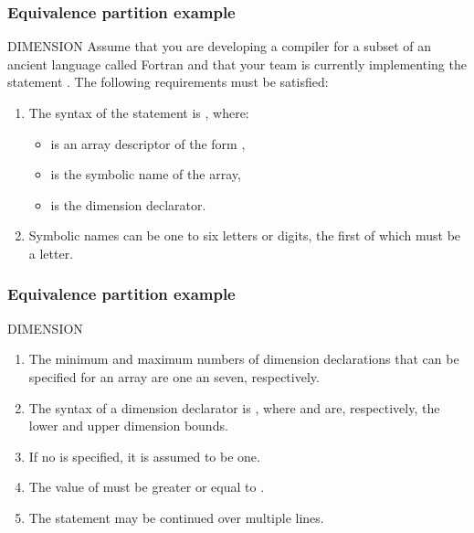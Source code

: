 \begin{frame}[hasprev=false, hasnext=true]
\frametitle{Equivalence partition example}

\begin{block:fact}{DIMENSION}
Assume that you are developing a compiler for a subset of an ancient language
called Fortran and that your team is currently implementing the statement
. The following requirements must be satisfied:

\begin{enumerate}
	\item The syntax of the  statement is
	, where:
	\begin{itemize}
		\item {} is an array descriptor of the form
		,

		\item {} is the symbolic name of the array,

		\item {} is the dimension declarator.
	\end{itemize}

	\item Symbolic names can be one to six letters or digits, the first of
	which must be a letter.
\end{enumerate}
\end{block:fact}
\end{frame}


\begin{frame}[hasprev=false, hasnext=true]
\frametitle{Equivalence partition example}

\begin{block:fact}{DIMENSION}
\begin{enumerate}
	\item The minimum and maximum numbers of dimension declarations that can
	be specified for an array are one an seven, respectively.

	\item The syntax of a dimension declarator is \srccode{lb: ]ub}, where
	 and  are, respectively, the lower and upper
	dimension bounds.

	\item If no  is specified, it is assumed to be one.

	\item The value of  must be greater or equal to .

	\item The  statement may be continued over multiple
	lines.
\end{enumerate}
\end{block:fact}
\end{frame}


